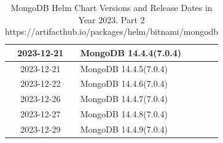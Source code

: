 \documentclass[../main.tex]{subfiles}
\begin{document}
\begin{table}[h]
\begin{minipage}{0.45\textwidth}
\begin{tabular}{|c|l|}
    2023-12-21 & MongoDB 14.4.4(7.0.4) \\ \hline  
    2023-12-21 & MongoDB 14.4.5(7.0.4) \\ \hline  
    2023-12-22 & MongoDB 14.4.6(7.0.4) \\ \hline  
    2023-12-26 & MongoDB 14.4.7(7.0.4) \\ \hline  
    2023-12-27 & MongoDB 14.4.8(7.0.4) \\ \hline  
    2023-12-29 & MongoDB 14.4.9(7.0.4) \\ \hline
\end{tabular}
\caption{MongoDB Helm Chart Versions and Release Dates in Year 2023. Part 2 https://artifacthub.io/packages/helm/bitnami/mongodb}
\label{table:mongodb_helm_versions}
\end{minipage}
\end{table}
\end{document}

